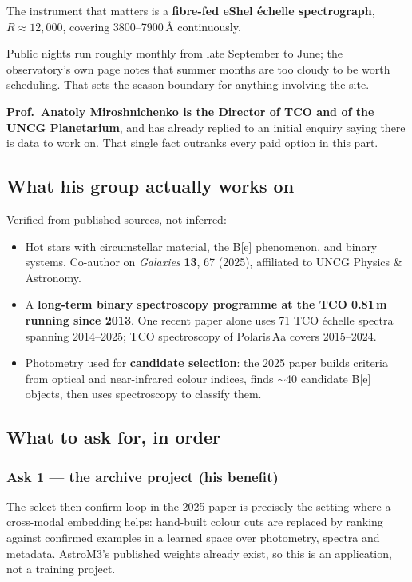 \documentclass[11pt]{article}
\begin{document}
The instrument that matters is a \textbf{fibre-fed eShel \'echelle
spectrograph}, $R \approx 12{,}000$, covering 3800--7900\,\AA{} continuously.

Public nights run roughly monthly from late September to June; the observatory's
own page notes that summer months are too cloudy to be worth scheduling. That
sets the season boundary for anything involving the site.

\begin{keybox}
\textbf{Prof.\ Anatoly Miroshnichenko is the Director of TCO and of the UNCG
Planetarium}, and has already replied to an initial enquiry saying there is data
to work on. That single fact outranks every paid option in this part.
\end{keybox}

\subsection{What his group actually works on}

Verified from published sources, not inferred:

\begin{itemize}
\item Hot stars with circumstellar material, the B[e] phenomenon, and binary
      systems. Co-author on \emph{Galaxies} \textbf{13}, 67 (2025), affiliated
      to UNCG Physics \& Astronomy.
\item A \textbf{long-term binary spectroscopy programme at the TCO 0.81\,m
      running since 2013}. One recent paper alone uses 71 TCO \'echelle spectra
      spanning 2014--2025; TCO spectroscopy of Polaris\,Aa covers 2015--2024.
\item Photometry used for \textbf{candidate selection}: the 2025 paper builds
      criteria from optical and near-infrared colour indices, finds
      $\sim$40 candidate B[e] objects, then uses spectroscopy to classify them.
\end{itemize}

\subsection{What to ask for, in order}

\subsubsection*{Ask 1 --- the archive project (his benefit)}

The select-then-confirm loop in the 2025 paper is precisely the setting where a
cross-modal embedding helps: hand-built colour cuts are replaced by ranking
against confirmed examples in a learned space over photometry, spectra and
metadata. AstroM3's published weights already exist, so this is an application,
not a training project.
\end{document}
